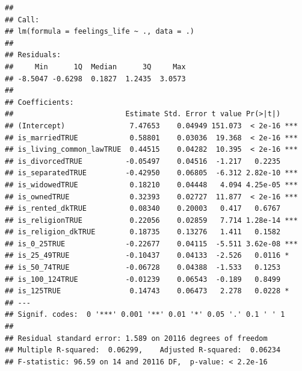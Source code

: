 \documentclass[]{article}
\begin{document}
\begin{verbatim}
## 
## Call:
## lm(formula = feelings_life ~ ., data = .)
## 
## Residuals:
##     Min      1Q  Median      3Q     Max 
## -8.5047 -0.6298  0.1827  1.2435  3.0573 
## 
## Coefficients:
##                          Estimate Std. Error t value Pr(>|t|)    
## (Intercept)               7.47653    0.04949 151.073  < 2e-16 ***
## is_marriedTRUE            0.58801    0.03036  19.368  < 2e-16 ***
## is_living_common_lawTRUE  0.44515    0.04282  10.395  < 2e-16 ***
## is_divorcedTRUE          -0.05497    0.04516  -1.217   0.2235    
## is_separatedTRUE         -0.42950    0.06805  -6.312 2.82e-10 ***
## is_widowedTRUE            0.18210    0.04448   4.094 4.25e-05 ***
## is_ownedTRUE              0.32393    0.02727  11.877  < 2e-16 ***
## is_rented_dkTRUE          0.08340    0.20003   0.417   0.6767    
## is_religionTRUE           0.22056    0.02859   7.714 1.28e-14 ***
## is_religion_dkTRUE        0.18735    0.13276   1.411   0.1582    
## is_0_25TRUE              -0.22677    0.04115  -5.511 3.62e-08 ***
## is_25_49TRUE             -0.10437    0.04133  -2.526   0.0116 *  
## is_50_74TRUE             -0.06728    0.04388  -1.533   0.1253    
## is_100_124TRUE           -0.01239    0.06543  -0.189   0.8499    
## is_125TRUE                0.14743    0.06473   2.278   0.0228 *  
## ---
## Signif. codes:  0 '***' 0.001 '**' 0.01 '*' 0.05 '.' 0.1 ' ' 1
## 
## Residual standard error: 1.589 on 20116 degrees of freedom
## Multiple R-squared:  0.06299,    Adjusted R-squared:  0.06234 
## F-statistic: 96.59 on 14 and 20116 DF,  p-value: < 2.2e-16
\end{verbatim}
\end{document}
